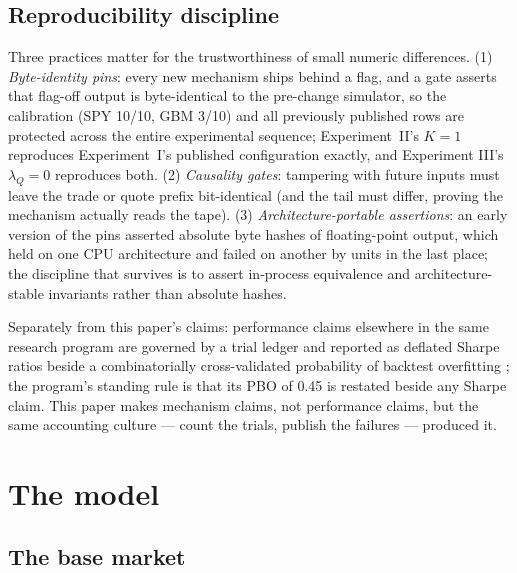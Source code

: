 \documentclass[11pt]{article}
\begin{document}
\subsection{Reproducibility discipline}
\label{sec:repro-discipline}

Three practices matter for the trustworthiness of small numeric differences.
(1) \emph{Byte-identity pins}: every new mechanism ships behind a flag, and a
gate asserts that flag-off output is byte-identical to the pre-change
simulator, so the calibration (SPY 10/10, GBM 3/10) and all previously
published rows are protected across the entire experimental sequence;
Experiment~II's $K{=}1$
reproduces Experiment~I's published configuration exactly, and Experiment
III's $\lambda_Q{=}0$ reproduces both. (2) \emph{Causality gates}: tampering
with future inputs must leave the trade or quote prefix bit-identical (and the
tail must differ, proving the mechanism actually reads the tape). (3)
\emph{Architecture-portable assertions}: an early version of the pins asserted
absolute byte hashes of floating-point output, which held on one CPU
architecture and failed on another by units in the last place; the discipline
that survives is to assert in-process equivalence and architecture-stable
invariants rather than absolute hashes.

Separately from this paper's claims: performance claims elsewhere in the same
research program are governed by a trial ledger and reported as deflated
Sharpe ratios \citep{bailey2014} beside a combinatorially cross-validated
probability of backtest overfitting \citep{bailey2017}; the program's standing
rule is that its PBO of 0.45 is restated beside any Sharpe claim. This paper
makes mechanism claims, not performance claims, but the same accounting
culture \citep{harvey2016} --- count the trials, publish the failures ---
produced it.

\section{The model}
\label{sec:model}

\subsection{The base market}
\label{sec:model:base}
\end{document}
